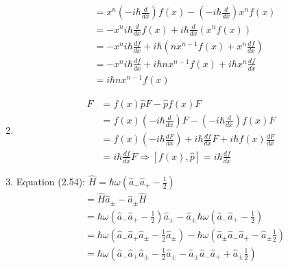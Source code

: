 \documentclass{article}
\begin{document}
\begin{enumerate}[label=(\alph*)]
\begin{align*}
		                         & = x^n \left(-i \hbar \frac{d}{dx}\right) f(x) - \left(-i \hbar \frac{d}{dx}\right) x^n f(x) \\
		                         & = -x^n i \hbar \frac{d}{dx} f(x) + i \hbar \frac{d}{dx} (x^n f(x))                          \\
		                         & = - x^n i \hbar \frac{df}{dx} + i \hbar (n x^{n-1} f(x) + x^n \frac{df}{dx})                \\
		                         & = -x^n i \hbar \frac{df}{dx} + i\hbar n x^{n-1} f(x) + i\hbar x^n \frac{df}{dx}             \\
		                         & = i\hbar n x^{n-1} f(x)
	      \end{align*}
	\item
	      \begin{align*}
		      [f(x), \hat{p}]F & = f(x) \hat{p}F - \hat{p} f(x)F                                                       \\
		                       & = f(x) \left(-i \hbar \frac{d}{dx}\right)F - \left(-i \hbar \frac{d}{dx}\right) f(x)F \\
		                       & = f(x) (-i \hbar \frac{dF}{dx}) + i \hbar \frac{df}{dx}F + i \hbar f(x) \frac{dF}{dx} \\
		                       & = i\hbar \frac{df}{dx}F \Rightarrow [f(x), \hat{p}] = i\hbar \frac{df}{dx}
	      \end{align*}
	\item Equation (2.54): \(\hat{H} = \hbar \omega (\hat{a}_- \hat{a}_+ - \frac{1}{2})\)
	      \begin{align*}
		      [\hat{H}, \hat{a}_\pm] & = \hat{H} \hat{a}_\pm - \hat{a}_\pm \hat{H}                                                                                                                                          \\
		                             & =  \hbar \omega (\hat{a}_- \hat{a}_+ - \frac{1}{2}) \hat{a}_\pm - \hat{a}_\pm \hbar \omega (\hat{a}_- \hat{a}_+ - \frac{1}{2})                                                       \\
		                             & = \hbar \omega (\hat{a}_- \hat{a}_+ \hat{a}_\pm - \frac{1}{2} \hat{a}_\pm) - \hbar \omega (\hat{a}_\pm \hat{a}_- \hat{a}_+ - \hat{a}_\pm\frac{1}{2} )                                \\
		                             & = \hbar \omega (\hat{a}_- \hat{a}_+ \hat{a}_\pm - \frac{1}{2} \hat{a}_\pm - \hat{a}_\pm \hat{a}_- \hat{a}_+ + \hat{a}_\pm\frac{1}{2} )                                               \\

\end{align*}
\end{enumerate}
\end{document}
